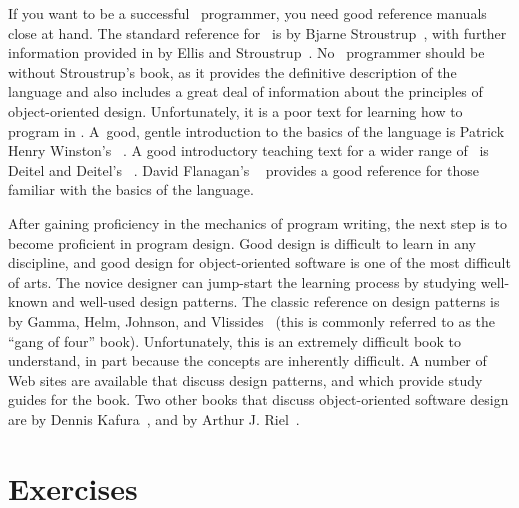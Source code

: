 If you want to be a successful \Lang\ programmer, you
need good reference manuals close at hand.
{The standard reference for \Lang\ is
 by
Bjarne Stroustrup~\cite{Stroustrup},
with further information provided in
by Ellis and Stroustrup~\cite{Ellis}.
No \Lang\ programmer should be without
Stroustrup's book, as it provides the definitive description of the
language and also includes a great deal of information about the
principles of object-oriented design.
Unfortunately, it is a poor text for learning how to program in \Lang.
A~good, gentle introduction to the basics of the language is
Patrick Henry Winston's ~\cite{Winston}.
A good introductory teaching text for a wider range of \Lang\ is
Deitel and Deitel's ~\cite{DeitelCPP}.}{}
{David Flanagan's ~\cite{Flanagan}
provides a good reference for those familiar with the basics of the
language.}{}

After gaining proficiency in the mechanics of program writing, the
next step is to become proficient in program design.
Good design is difficult to learn in any discipline, and good design
for object-oriented software is one of the most difficult of arts.
The novice designer can jump-start the learning process
by studying well-known and well-used design patterns.
The classic reference on design patterns is
by Gamma, Helm, Johnson, and Vlissides~\cite{GOF}
(this is commonly referred to as the ``gang of four'' book).
Unfortunately, this is an extremely difficult book to understand,
in part because the concepts are inherently difficult.
A number of Web sites are available that discuss design patterns,
and which provide study guides for the  book.
Two other books that discuss object-oriented software design are
by Dennis Kafura~\cite{OOKafura},
and  by
Arthur J. Riel~\cite{OORiel}.


\section{Exercises}

